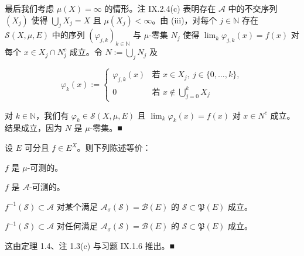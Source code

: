 \begin{theorem}
\begin{subitems}
\item

最后我们考虑 $ \mu(X) = \infty $ 的情形。注 IX.2.4(c) 表明存在 $ \mathcal{A} $ 中的不交序列 $ (X_j) $ 使得 $ \bigcup_j X_j = X $ 且 $ \mu(X_j) < \infty $。由 (iii)，对每个 $ j \in \mathbb{N} $ 存在 $ \mathcal{S}(X,\mu,E) $ 中的序列 $ (\varphi_{j,k})_{k \in \mathbb{N}} $ 与 $ \mu $-零集 $ N_j $ 使得 $ \lim_k \varphi_{j,k}(x) = f(x) $ 对每个 $ x \in X_j \cap N_j^c $ 成立。令 $ N := \bigcup_j N_j $ 及

\begin{equation*}
\varphi_k(x) := \begin{cases} \varphi_{j,k}(x) & \text{若 } x \in X_j ,\ j \in \{0,\ldots,k\} , \\ 0 & \text{若 } x \notin \bigcup_{j=0}^{k} X_j \end{cases}
\end{equation*}

对 $ k \in \mathbb{N} $，我们有 $ \varphi_k \in \mathcal{S}(X,\mu,E) $ 且 $ \lim_k \varphi_k(x) = f(x) $ 对 $ x \in N^c $ 成立。结果成立，因为 $ N $ 是 $ \mu $-零集。\nobreak\hspace{0.35em}■

\end{subitems}

\end{theorem}

\begin{corollary}

设 $ E $ 可分且 $ f \in E^X $。则下列陈述等价：

\begin{subitems}
\item

$ f $ 是 $ \mu $-可测的。

\item

$ f $ 是 $ \mathcal{A} $-可测的。

\item

$ f^{-1}(\mathcal{S}) \subset \mathcal{A} $ 对某个满足 $ \mathcal{A}_\sigma(\mathcal{S}) = \mathcal{B}(E) $ 的 $ \mathcal{S} \subset \mathfrak{P}(E) $ 成立。

\item

$ f^{-1}(\mathcal{S}) \subset \mathcal{A} $ 对任何满足 $ \mathcal{A}_\sigma(\mathcal{S}) = \mathcal{B}(E) $ 的 $ \mathcal{S} \subset \mathfrak{P}(E) $ 成立。

\proofhead
这由定理 1.4、注 1.3(c) 与习题 IX.1.6 推出。\nobreak\hspace{0.35em}■
\end{subitems}

\end{corollary}

